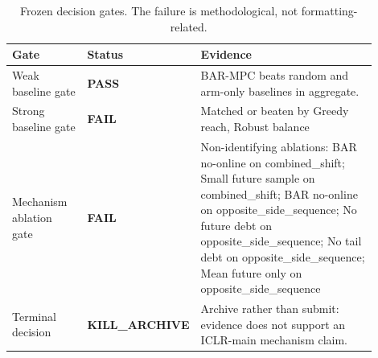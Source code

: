 \begin{table}[t]
\centering
\caption{Frozen decision gates. The failure is methodological, not formatting-related.}
\label{tab:gates}
\small
\begin{tabular}{p{0.22\linewidth}p{0.13\linewidth}p{0.55\linewidth}}
\toprule
Gate & Status & Evidence \\
\midrule
Weak baseline gate & \textbf{PASS} & BAR-MPC beats random and arm-only baselines in aggregate. \\
Strong baseline gate & \textbf{FAIL} & Matched or beaten by Greedy reach, Robust balance \\
Mechanism ablation gate & \textbf{FAIL} & Non-identifying ablations: BAR no-online on combined\_shift; Small future sample on combined\_shift; BAR no-online on opposite\_side\_sequence; No future debt on opposite\_side\_sequence; No tail debt on opposite\_side\_sequence; Mean future only on opposite\_side\_sequence \\
Terminal decision & \textbf{KILL\_ARCHIVE} & Archive rather than submit: evidence does not support an ICLR-main mechanism claim. \\
\bottomrule
\end{tabular}
\end{table}

